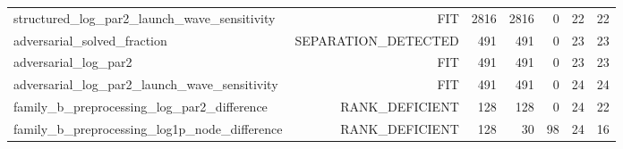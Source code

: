 {\begin{longtable}{lrrrrrr}
structured\_log\_par2\_launch\_wave\_sensitivity & FIT & 2816 & 2816 & 0 & 22 & 22 \\
adversarial\_solved\_fraction & SEPARATION\_DETECTED & 491 & 491 & 0 & 23 & 23 \\
adversarial\_log\_par2 & FIT & 491 & 491 & 0 & 23 & 23 \\
adversarial\_log\_par2\_launch\_wave\_sensitivity & FIT & 491 & 491 & 0 & 24 & 24 \\
family\_b\_preprocessing\_log\_par2\_difference & RANK\_DEFICIENT & 128 & 128 & 0 & 24 & 22 \\
family\_b\_preprocessing\_log1p\_node\_difference & RANK\_DEFICIENT & 128 & 30 & 98 & 24 & 16 \\
\bottomrule
\end{longtable}
}
